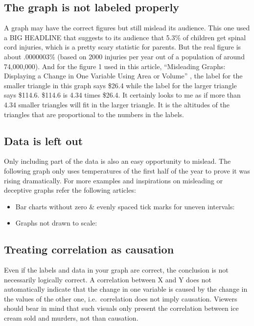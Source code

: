 \documentclass[]{book}
\providecommand{\tightlist}{%
  \setlength{\itemsep}{0pt}\setlength{\parskip}{0pt}}
\theoremstyle{definition}
\theoremstyle{definition}
\theoremstyle{definition}
\theoremstyle{remark}
\begin{document}
\subsection{The graph is not labeled
properly}\label{the-graph-is-not-labeled-properly}

A graph may have the correct figures but still mislead its audience.
This one used a BIG HEADLINE that suggests to its audience that 5.3\% of
children get spinal cord injuries, which is a pretty scary statistic for
parents. But the real figure is about .0000003\% (based on 2000 injuries
per year out of a population of around 74,000,000). And for the figure 1
used in this article, ``Misleading Graphs: Displaying a Change in One
Variable Using Area or Volume'' \citep{scaling_issues}, the label for
the smaller triangle in this graph says \$26.4 while the label for the
larger triangle says \$114.6. \$114.6 is 4.34 times \$26.4. It certainly
looks to me as if more than 4.34 smaller triangles will fit in the
larger triangle. It is the altitudes of the triangles that are
proportional to the numbers in the labels.

\subsection{Data is left out}\label{data-is-left-out}

Only including part of the data is also an easy opportunity to mislead.
The following graph only uses temperatures of the first half of the year
to prove it was rising dramatically. For more examples and inspirations
on misleading or deceptive graphs refer the following articles:

\begin{itemize}
\tightlist
\item
  Bar charts without zero \& evenly spaced tick marks for uneven
  intervals: \citep{whats_wrong}
\item
  Graphs not drawn to scale:\citep{scaling_issues}
\end{itemize}

\subsection{Treating correlation as
causation}\label{treating-correlation-as-causation}

Even if the labels and data in your graph are correct, the conclusion is
not necessarily logically correct. A correlation between X and Y does
not automatically indicate that the change in one variable is caused by
the change in the values of the other one, i.e.~correlation does not
imply causation. Viewers should bear in mind that such visuals only
present the correlation between ice cream sold and murders, not than
causation.
\end{document}
